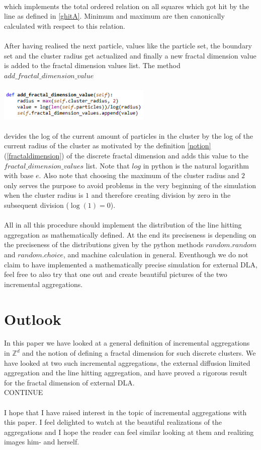 \documentclass[12pt,a4paper]{scrartcl}
\numberwithin{equation}{subsection}
\newcommand{\Z}{\mathbb{Z}} %
\newcommand{\1}{\mathbbm{1}}
\numberwithin{equation}{section}
\theoremstyle{definition}
\begin{document}
\\
which implements the total ordered relation on all squares which got hit by the line as defined in \ref{ghitA}. Minimum and maximum are then canonically calculated with respect to this relation. \\
\\After having realised the next particle, values like the particle set, the boundary set and the cluster radius get actualized and finally a new fractal dimension value is added to the fractal dimension values list. The method $\mathit{add\_fractal\_dimension\_value}$ \\
\\
\includegraphics[height=1.5cm]{images/code-snippets/fractaldimension.png} \\
\\
devides the log of the current amount of particles in the cluster by the log of the current radius of the cluster as motivated by the definition \ref{notion} (\ref{fractaldimension}) of the discrete fractal dimension and adds this value to the $\mathit{fractal\_dimension\_values}$ list. Note that $\mathit{log}$ in python is the natural logarithm with base $e$. Also note that choosing the maximum of the cluster radius and $2$ only serves the purpose to avoid problems in the very beginning of the simulation when the cluster radius is $1$ and therefore creating division by zero in the subsequent division ($\log(1)=0$).\\
\\All in all this procedure should implement the distribution of the line hitting aggregation as mathematically defined. At the end its preciseness is depending on the preciseness of the distributions given by the python methods $\mathit{random.random}$ and $\mathit{random.choice}$, and machine calculation in general. Eventhough we do not claim to have implemented a mathematically precise simulation for external DLA, feel free to also try that one out and create beautiful pictures of the two incremental aggregations. 

\newpage

\section{Outlook}
In this paper we have looked at a general definition of incremental aggregations in $\Z^d$ and the notion of defining a fractal dimension for such discrete clusters. We have looked at two such incremental aggregations, the external diffusion limited aggregation and the line hitting aggregation, and have proved a rigorous result for the fractal dimension of external DLA.\\ 
CONTINUE\\
\\I hope that I have raised interest in the topic of incremental aggregations with this paper. I feel delighted to watch at the beautiful realizations of the aggregations and I hope the reader can feel similar looking at them and realizing images him- and herself. 
\end{document}
